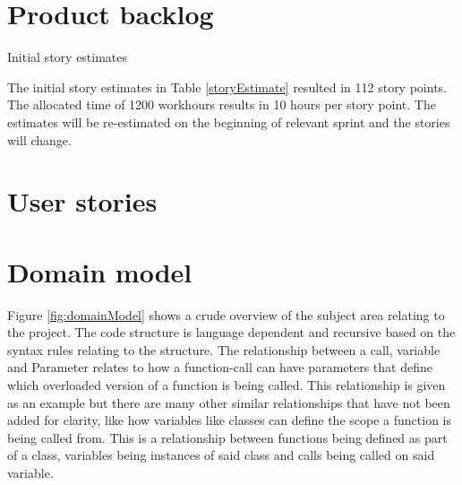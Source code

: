 \section{Product backlog}
\begin{table}
    \caption{Initial story estimates}
    \label{storyEstimate}
    
\end{table}

The initial story estimates in Table \ref{storyEstimate} resulted in 112 story points. The allocated time of 1200 workhours results in 10 hours per story point. The estimates will be re-estimated on the beginning of relevant sprint and the stories will change. 

\section{User stories}
%    
%

\section{Domain model}



Figure \ref{fig:domainModel} shows a crude overview of the subject area relating to the project. The code structure is language dependent and \gls{recursive} based on the \gls{syntax} rules relating to the structure. The relationship between a call, variable and Parameter relates to how a function-call can have parameters that define which overloaded version of a function is being called. This relationship is given as an example but there are many other similar relationships that have not been added for clarity, like how variables like classes can define the scope a function is being called from. This is a relationship between functions being defined as part of a class, variables being instances of said class and calls being called on said variable.

